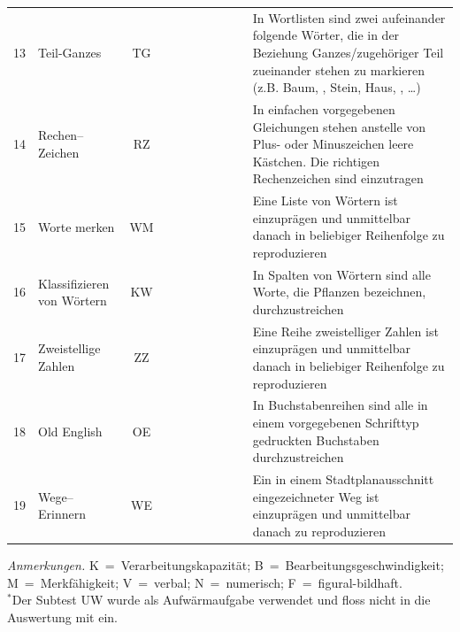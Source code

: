 \documentclass[11pt, twoside, a4paper]{book}		%
\begin{document}
\begin{table}
\begin{adjustbox}{width=\textwidth,totalheight=.9\textheight,keepaspectratio}
\begin{threeparttable}
\begin{tabular}{l l c c c c p{.0001cm} c c c p{20cm}}
				13				&	Teil-Ganzes				&	TG			&&	\checkmark	&&&\checkmark&&& In Wortlisten sind zwei aufeinander folgende Wörter, die in der Beziehung Ganzes/zugehöriger Teil zueinander stehen zu markieren (z.B. Baum, \cancel{Blatt}, Stein, Haus, \cancel{Dach}, \ldots)\\
				14				&	Rechen--Zeichen			&	RZ			&&	\checkmark	&&&&\checkmark&& In  einfachen vorgegebenen Gleichungen stehen anstelle von Plus- oder Minuszeichen leere Kästchen. Die richtigen Rechenzeichen sind einzutragen\\
				15				&	Worte merken			&	WM			&&&	\checkmark	&&\checkmark&&& Eine Liste von Wörtern ist einzuprägen und unmittelbar danach in beliebiger Reihenfolge zu reproduzieren\\ 
				16				&	Klassifizieren von Wörtern&	KW			&&	\checkmark	&&&\checkmark&&& In Spalten von Wörtern sind alle Worte, die Pflanzen bezeichnen, durchzustreichen\\
				17				&	Zweistellige Zahlen		&	ZZ			&&&	\checkmark	&&&\checkmark&& Eine Reihe zweistelliger Zahlen ist einzuprägen und unmittelbar danach in beliebiger Reihenfolge zu reproduzieren\\
				18				&	Old English				&	OE			&&	\checkmark	&&&&&\checkmark& In Buchstabenreihen sind alle in einem vorgegebenen Schrifttyp gedruckten Buchstaben durchzustreichen\\
				19				&	Wege--Erinnern			&	WE			&&&	\checkmark	&&&&\checkmark& Ein in einem Stadtplanausschnitt eingezeichneter Weg ist einzuprägen und unmittelbar danach zu reproduzieren\\
				
				\hline
			\end{tabular}
			
			\begin{tablenotes}[flushleft]
				\footnotesize				%
				\setlength{}	%
				\item \textit{Anmerkungen.} K~=~Verarbeitungskapazität; B~=~Bearbeitungsgeschwindigkeit; M~=~Merkfähigkeit; V~=~verbal; N~=~numerisch; F~=~figural-bildhaft.\\
				{$^*$}Der Subtest UW wurde als Aufwärmaufgabe verwendet und floss nicht in die Auswertung mit ein.
			\end{tablenotes}
		\end{threeparttable}
	\end{adjustbox}
\end{table}
\end{document}
